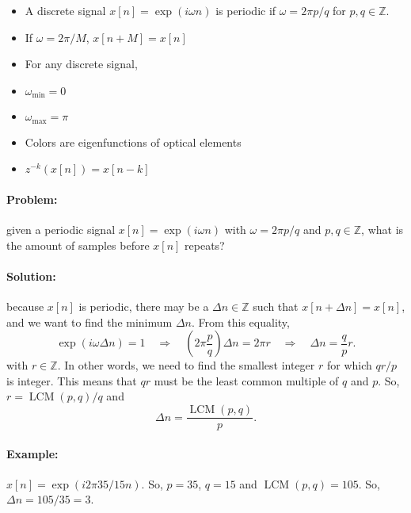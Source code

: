 \documentclass[14paper, 12pt]{article}
\newcommand\integer{\mathbb{Z}}
\DeclareMathOperator{\LCM}{LCM}
\begin{document}
\begin{itemize}
	\item A discrete signal $x[n] = \exp(i\omega n)$ is periodic if $\omega = 2\pi p/q$ for $p,q\in\integer$.
	\item If $\omega = 2\pi/M$, $x[n+M] = x[n]$
	\item For any discrete signal,
	\item $\omega_\text{min} = 0$
	\item $\omega_\text{max} = \pi$
	\item Colors are eigenfunctions of optical elements
	\item $z^{-k}\left(x[n]\right) = x[n-k]$
\end{itemize}

	\paragraph{Problem:} given a periodic signal $x[n]=\exp(i\omega n)$ with $\omega = 2\pi p/q$ and $p,q\in\integer$, what is the amount of samples before $x[n]$ repeats?

	\paragraph{Solution:} because $x[n]$ is periodic, there may be a $\Delta n\in\integer$ such that $x[n+\Delta n] = x[n]$, and we want to find the minimum $\Delta n$. From this equality,
	\begin{equation}
	\exp(i\omega\Delta n) = 1 \quad\Rightarrow\quad
		\left(2\pi\frac{p}{q}\right)\Delta n = 2\pi r \quad\Rightarrow\quad
			\Delta n = \frac{q}{p} r.
	\end{equation}
	with $r\in\integer$. In other words, we need to find the smallest integer $r$ for which $qr/p$ is integer. This means that $qr$ must be the least common multiple of $q$ and $p$. So, $r = \LCM(p,q)/q$ and
	\begin{equation}
		\Delta n = \frac{\LCM(p,q)}{p}.
	\end{equation}

	\paragraph{Example:} $x[n]=\exp(i2\pi35/15n)$. So, $p=35$, $q=15$ and $\LCM(p,q) = 105$. So, $\Delta n = 105/35 = 3$.
\end{document}
